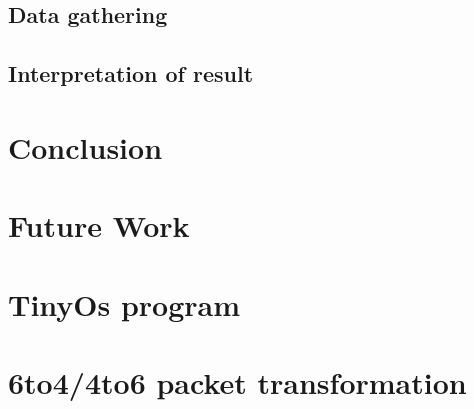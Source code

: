 \documentclass[oneside,12pt,a4paper,final]{book}
\begin{document}
\section{Data gathering}
\section{Interpretation of result}

\chapter{Conclusion}

\chapter{Future Work}

\appendix
\chapter{TinyOs program}
\chapter{6to4/4to6 packet transformation}

 


\newpage

\listoffigures
\listoftables
\end{document}
